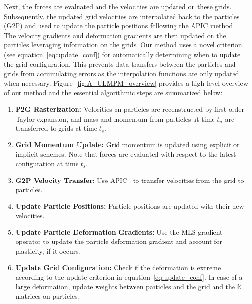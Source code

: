 Next, the forces are evaluated and the velocities are updated on these grids. Subsequently, the updated grid velocities are interpolated back to the particles (G2P) and used to update the particle positions following the APIC method~\cite{jiang:2015:apic}. 
The velocity gradients and deformation gradients are then updated on the particles leveraging information on the grids. 
Our method uses a novel criterion (see equation~\eqref{eq:update_conf}) for automatically determining when to update the grid configuration. 
This prevents data transfers between the particles and grids from accumulating errors as the interpolation functions are only updated when necessary. Figure~\ref{fig:A_ULMPM_overview} provides a high-level overview of our method and the essential algorithmic steps are summarized below: %
\begin{enumerate}
\item{\textbf{P2G Rasterization:}}
Velocities on particles are reconstructed by first-order Taylor expansion, and mass and momentum from particles at time $t_n$ are transferred to grids at time $t_s$. 
\item{\textbf{Grid Momentum Update:}} 
Grid momentum is updated using explicit or implicit schemes. Note that forces are evaluated with respect to the latest configuration at time $t_s$. 
\item{\textbf{G2P Velocity Transfer:}}
Use APIC~\cite{jiang:2015:apic} to transfer velocities from the grid to particles. 
\item{\textbf{Update Particle Positions:}}
Particle positions are updated with their new velocities.
\item{\textbf{Update Particle Deformation Gradients:}}
Use the MLS gradient operator to update the particle deformation gradient and account for plasticity, if it occurs.
\item{\textbf{Update Grid Configuration:}}
Check if the deformation is extreme according to the update criterion in equation~\eqref{eq:update_conf}. In case of a large deformation, update weights between particles and the grid and the $\mathbb{K}$ matrices on particles. 
\end{enumerate} 

